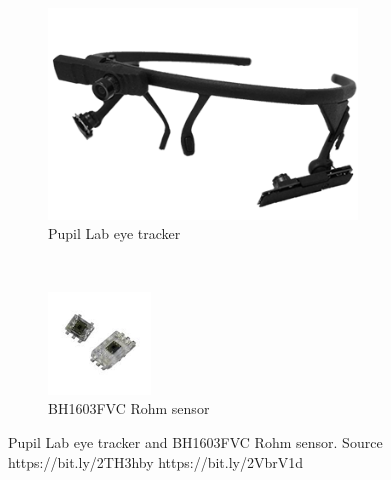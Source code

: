 \documentclass[USenglish,twocolumn]{article}
\begin{document}
\begin{figure}[H]
	\captionsetup[subfigure]{justification=centering}
	\centering
	\begin{subfigure}[b]{0.5\textwidth}
		\centering
		\includegraphics[width=0.9\textwidth]{img/pupilLab.png}
		\caption{Pupil Lab eye tracker}
		\label{fig:pupilLab}
	\end{subfigure}
	~ %
	\begin{subfigure}[b]{0.5\textwidth}
		\centering
		\includegraphics[width=0.3\textwidth]{img/rohm.png}
		\caption{BH1603FVC Rohm sensor}
		\label{fig:luxometer}
	\end{subfigure}
	\caption{Pupil Lab eye tracker and BH1603FVC Rohm sensor. Source https://bit.ly/2TH3hby https://bit.ly/2VbrV1d}	
	\label{fig:sensors}
\end{figure}

\newpage
\end{document}
